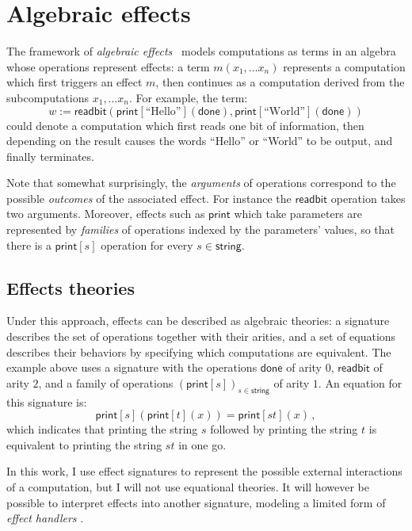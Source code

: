\documentclass[11pt,oneside,draft]{book}
\theoremstyle{definition}
\newcommand{\kw}[1]{\ensuremath{ \mathsf{#1} }}
\begin{document}


\section{Algebraic effects} \label{sec:eff} %


The framework of \emph{algebraic effects}~\citep{effadq}
models computations as terms in an algebra
whose operations represent effects:
a term $m(x_1, \ldots x_n)$
represents a computation which first
triggers an effect $m$,
then continues as a computation derived from
the subcomputations $x_1, \ldots x_n$.
For example,
the term:
\[
  w :=
    \kw{readbit}(
      \kw{print}[\text{``Hello''}](\kw{done}),
      \kw{print}[\text{``World''}](\kw{done}))
\]
could denote a computation which
first reads one bit of information,
then depending on the result
causes the words ``Hello'' or ``World'' to be output,
and finally terminates.

Note that somewhat surprisingly,
the \emph{arguments} of operations correspond to
the possible \emph{outcomes} of the associated effect.
For instance the $\kw{readbit}$ operation takes two arguments.
Moreover,
effects such as $\kw{print}$
which take parameters
are represented by \emph{families}
of operations indexed by the parameters' values,
so that there is a $\kw{print}[s]$
operation for every $s \in \kw{string}$.


\subsection{Effects theories} %

Under this approach,
effects can be described as algebraic theories:
a signature describes the set of operations together with their arities,
and a set of equations describes their behaviors
by specifying which computations are equivalent.
The example above uses a signature with the operations
$\kw{done}$ of arity $0$,
$\kw{readbit}$ of arity $2$,
and a family of operations $(\kw{print}[s])_{s \in \kw{string}}$
of arity $1$.
An equation for this signature is:
\[
    \kw{print}[s](\kw{print}[t](x)) =
    \kw{print}[st](x) \,,
\]
which indicates that
printing the string $s$ followed by
printing the string $t$ is equivalent to
printing the string $st$ in one go.

In this work,
I use effect signatures to represent
the possible external interactions
of a computation,
but I will not use equational theories.
It will however be possible to interpret effects
into another signature,
modeling a limited form of
\emph{effect handlers} \citep{eff}.
\end{document}
